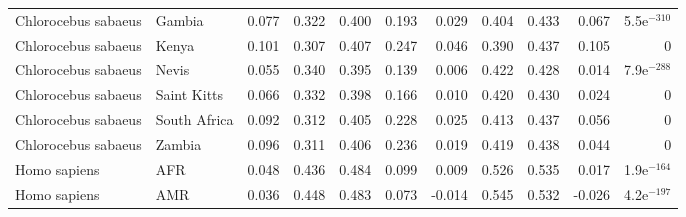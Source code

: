 \begin{center}
\begin{adjustbox}{width = 1\textwidth}
\begin{tabular}{llrrrrrrrrr}
 Chlorocebus sabaeus &                    Gambia &                              0.077 &                               0.322 &                 0.400 &                 0.193 &                              0.029 &                               0.404 &                 0.433 &                 0.067 & 5.5e$^{-310}$ \\
 Chlorocebus sabaeus &                     Kenya &                              0.101 &                               0.307 &                 0.407 &                 0.247 &                              0.046 &                               0.390 &                 0.437 &                 0.105 &             0 \\
 Chlorocebus sabaeus &                     Nevis &                              0.055 &                               0.340 &                 0.395 &                 0.139 &                              0.006 &                               0.422 &                 0.428 &                 0.014 & 7.9e$^{-288}$ \\
 Chlorocebus sabaeus &               Saint Kitts &                              0.066 &                               0.332 &                 0.398 &                 0.166 &                              0.010 &                               0.420 &                 0.430 &                 0.024 &             0 \\
 Chlorocebus sabaeus &              South Africa &                              0.092 &                               0.312 &                 0.405 &                 0.228 &                              0.025 &                               0.413 &                 0.437 &                 0.056 &             0 \\
 Chlorocebus sabaeus &                    Zambia &                              0.096 &                               0.311 &                 0.406 &                 0.236 &                              0.019 &                               0.419 &                 0.438 &                 0.044 &             0 \\
        Homo sapiens &                       AFR &                              0.048 &                               0.436 &                 0.484 &                 0.099 &                              0.009 &                               0.526 &                 0.535 &                 0.017 & 1.9e$^{-164}$ \\
        Homo sapiens &                       AMR &                              0.036 &                               0.448 &                 0.483 &                 0.073 &                             -0.014 &                               0.545 &                 0.532 &                -0.026 & 4.2e$^{-197}$ \\

\end{tabular}
\end{adjustbox}
\end{center}
